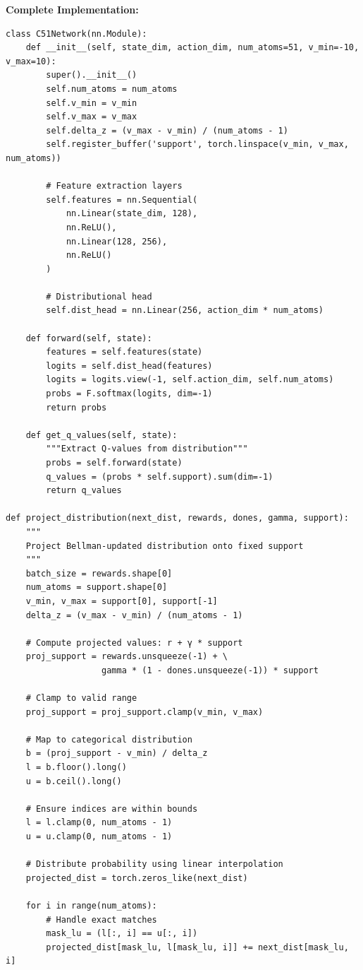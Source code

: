 \documentclass[12pt]{article}
\begin{document}
{{\textbf{Complete Implementation:}
\begin{verbatim}
class C51Network(nn.Module):
    def __init__(self, state_dim, action_dim, num_atoms=51, v_min=-10, v_max=10):
        super().__init__()
        self.num_atoms = num_atoms
        self.v_min = v_min
        self.v_max = v_max
        self.delta_z = (v_max - v_min) / (num_atoms - 1)
        self.register_buffer('support', torch.linspace(v_min, v_max, num_atoms))

        # Feature extraction layers
        self.features = nn.Sequential(
            nn.Linear(state_dim, 128),
            nn.ReLU(),
            nn.Linear(128, 256),
            nn.ReLU()
        )
        
        # Distributional head
        self.dist_head = nn.Linear(256, action_dim * num_atoms)

    def forward(self, state):
        features = self.features(state)
        logits = self.dist_head(features)
        logits = logits.view(-1, self.action_dim, self.num_atoms)
        probs = F.softmax(logits, dim=-1)
        return probs

    def get_q_values(self, state):
        """Extract Q-values from distribution"""
        probs = self.forward(state)
        q_values = (probs * self.support).sum(dim=-1)
        return q_values

def project_distribution(next_dist, rewards, dones, gamma, support):
    """
    Project Bellman-updated distribution onto fixed support
    """
    batch_size = rewards.shape[0]
    num_atoms = support.shape[0]
    v_min, v_max = support[0], support[-1]
    delta_z = (v_max - v_min) / (num_atoms - 1)
    
    # Compute projected values: r + γ * support
    proj_support = rewards.unsqueeze(-1) + \
                   gamma * (1 - dones.unsqueeze(-1)) * support
    
    # Clamp to valid range
    proj_support = proj_support.clamp(v_min, v_max)
    
    # Map to categorical distribution
    b = (proj_support - v_min) / delta_z
    l = b.floor().long()
    u = b.ceil().long()
    
    # Ensure indices are within bounds
    l = l.clamp(0, num_atoms - 1)
    u = u.clamp(0, num_atoms - 1)
    
    # Distribute probability using linear interpolation
    projected_dist = torch.zeros_like(next_dist)
    
    for i in range(num_atoms):
        # Handle exact matches
        mask_lu = (l[:, i] == u[:, i])
        projected_dist[mask_lu, l[mask_lu, i]] += next_dist[mask_lu, i]
        

\end{verbatim}}}
\end{document}
